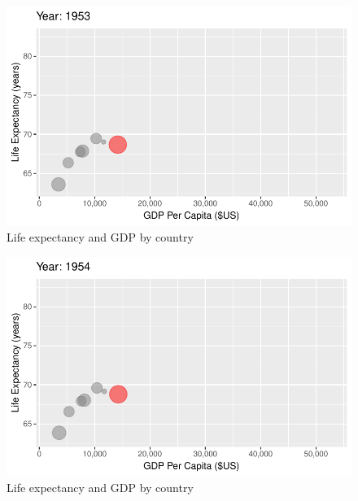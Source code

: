 \documentclass[
  letterpaper,
  DIV=11,
  numbers=noendperiod]{scrreport}
\theoremstyle{definition}
\theoremstyle{remark}
\begin{document}
\begin{figure}

{\centering \includegraphics{index_files/figure-pdf/fig-anim-country-3.pdf}

}

\caption{\label{fig-anim-country-3}Life expectancy and GDP by country}

\end{figure}

\begin{figure}

{\centering \includegraphics{index_files/figure-pdf/fig-anim-country-4.pdf}

}

\caption{\label{fig-anim-country-4}Life expectancy and GDP by country}

\end{figure}
\end{document}
